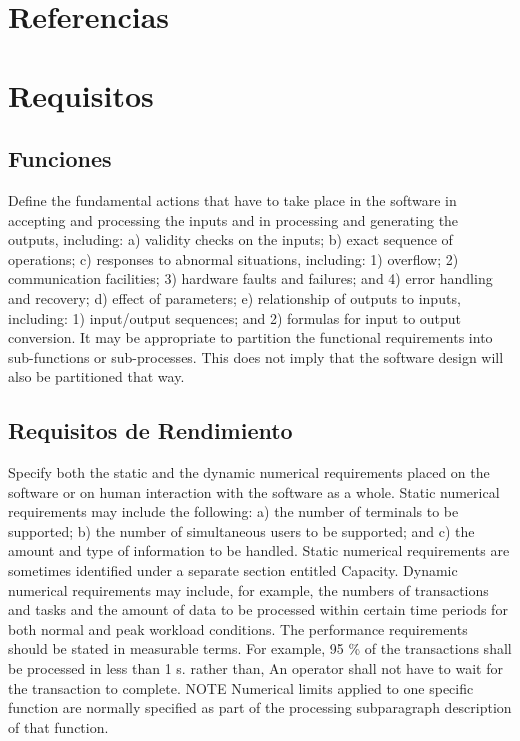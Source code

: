 \documentclass[12pt, a4paper, twoside]{article}
\begin{document}
\section{Referencias}

\section{Requisitos}
\subsection{Funciones}
Define the fundamental actions that have to take place in the software in accepting and processing the
inputs and in processing and generating the outputs, including:
a) validity checks on the inputs;
b) exact sequence of operations;
c) responses to abnormal situations, including:
1) overflow;
2) communication facilities;
3) hardware faults and failures; and
4) error handling and recovery;
d) effect of parameters;
e) relationship of outputs to inputs, including:
1) input/output sequences; and
2) formulas for input to output conversion.
It may be appropriate to partition the functional requirements into sub-functions or sub-processes.
This does not imply that the software design will also be partitioned that way.

\subsection{Requisitos de Rendimiento}
Specify both the static and the dynamic numerical requirements placed on the software or on human
interaction with the software as a whole.
Static numerical requirements may include the following:
a) the number of terminals to be supported;
b) the number of simultaneous users to be supported; and
c) the amount and type of information to be handled.
Static numerical requirements are sometimes identified under a separate section entitled Capacity.
Dynamic numerical requirements may include, for example, the numbers of transactions and tasks and
the amount of data to be processed within certain time periods for both normal and peak workload
conditions.
The performance requirements should be stated in measurable terms.
For example,
95 \% of the transactions shall be processed in less than 1 s.
rather than,
An operator shall not have to wait for the transaction to complete.
NOTE Numerical limits applied to one specific function are normally specified as part of the processing
subparagraph description of that function.
\end{document}
